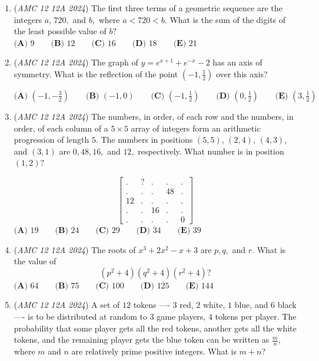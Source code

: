 \begin{enumerate}
	\item (\textit{AMC 12 12A 2024}) The first three terms of a geometric sequence are the integers $a,\,720,$ and $b,$ where $a<720<b.$ What is the sum of the digits of the least possible value of $b?$
$\textbf{(A) } 9 \qquad \textbf{(B) } 12 \qquad \textbf{(C) } 16 \qquad \textbf{(D) } 18 \qquad \textbf{(E) } 21$


	\item (\textit{AMC 12 12A 2024}) The graph of $y=e^{x+1}+e^{-x}-2$ has an axis of symmetry. What is the reflection of the point $(-1,\frac{1}{2})$ over this axis?


 $\textbf{(A) }\left(-1,-\frac{3}{2}\right)\qquad\textbf{(B) }(-1,0)\qquad\textbf{(C) }\left(-1,\frac{1}{2}\right)\qquad\textbf{(D) }\left(0,\frac{1}{2}\right)\qquad\textbf{(E) }\left(3,\frac{1}{2}\right)$


	\item (\textit{AMC 12 12A 2024}) The numbers, in order, of each row and the numbers, in order, of each column of a $5 \times 5$ array of integers form an arithmetic progression of length $5{.}$ The numbers in positions $(5, 5), \,(2,4),\,(4,3),$ and $(3, 1)$ are $0, 48, 16,$ and $12{,}$ respectively. What number is in position $(1, 2)?$

 \[\begin{bmatrix} . & ? &.&.&. \\ .&.&.&48&.\\ 12&.&.&.&.\\ .&.&16&.&.\\ .&.&.&.&0\end{bmatrix}\]
$\textbf{(A) } 19 \qquad \textbf{(B) } 24 \qquad \textbf{(C) } 29 \qquad \textbf{(D) } 34 \qquad \textbf{(E) } 39$


	\item (\textit{AMC 12 12A 2024}) The roots of $x^3 + 2x^2 - x + 3$ are $p, q,$ and $r.$ What is the value of 
 \[(p^2 + 4)(q^2 + 4)(r^2 + 4)?\]
$\textbf{(A) } 64 \qquad \textbf{(B) } 75 \qquad \textbf{(C) } 100 \qquad \textbf{(D) } 125 \qquad \textbf{(E) } 144$


	\item (\textit{AMC 12 12A 2024}) A set of $12$ tokens ---- $3$ red, $2$ white, $1$ blue, and $6$ black ---- is to be distributed at random to $3$ game players, $4$ tokens per player. The probability that some player gets all the red tokens, another gets all the white tokens, and the remaining player gets the blue token can be written as $\frac{m}{n}$, where $m$ and $n$ are relatively prime positive integers. What is $m+n$?



\end{enumerate}
